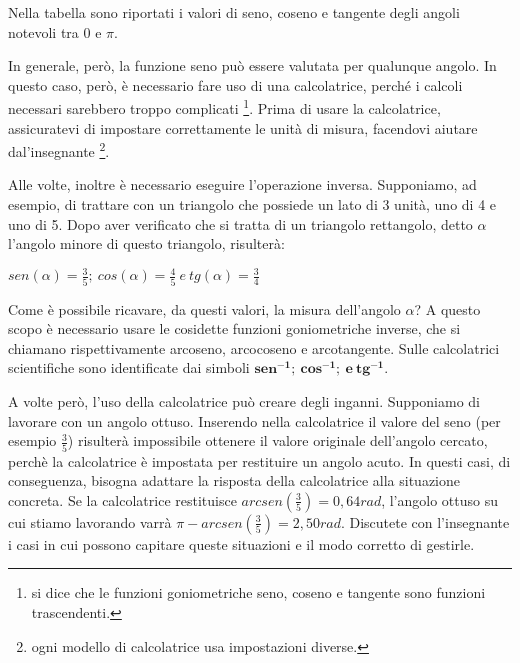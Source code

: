 Nella tabella sono riportati i valori di seno, coseno e tangente degli angoli notevoli tra $0$ e $\pi$.
\newline

In generale, però, la funzione seno può essere valutata per qualunque angolo. In questo caso, però, è necessario fare uso di una calcolatrice, perché i calcoli necessari sarebbero troppo complicati \footnote{si dice che le funzioni goniometriche seno, coseno e tangente sono funzioni trascendenti.}. Prima di usare la calcolatrice, assicuratevi di impostare correttamente le unità di misura, facendovi aiutare dal'insegnante \footnote{ogni modello di calcolatrice usa impostazioni diverse.}.\newline

Alle volte, inoltre è necessario eseguire l'operazione inversa. Supponiamo, ad esempio, di trattare con un triangolo che possiede un lato di 3 unità, uno di 4 e uno di 5.\newline
Dopo aver verificato che si tratta di un triangolo rettangolo, detto $\alpha$ l'angolo minore di questo triangolo, risulterà:\begin{center}
\begin{math}
sen(\alpha)=\frac 3 5 ;\ cos(\alpha)=\frac 4 5\ e\ tg(\alpha)=\frac 3 4
\end{math}
\end{center}
Come è possibile ricavare, da questi valori, la misura dell'angolo $\alpha$?\newline
A questo scopo è necessario usare le cosidette funzioni goniometriche inverse, che si chiamano rispettivamente arcoseno, arcocoseno e arcotangente. Sulle calcolatrici scientifiche sono identificate dai simboli $\mathbf {sen^{-1};\ cos^{-1};\ e\ tg^{-1}}$.
\newline

A volte però, l'uso della calcolatrice può creare degli inganni. Supponiamo di lavorare con un angolo ottuso. Inserendo nella calcolatrice il valore del seno (per esempio $\frac 3 5$) risulterà impossibile ottenere il valore originale dell'angolo cercato, perchè la calcolatrice è impostata per restituire un angolo acuto. In questi casi, di conseguenza, bisogna adattare la risposta della calcolatrice alla situazione concreta.\newline
Se la calcolatrice restituisce $arcsen(\frac 3 5 )=0,64 rad$, l'angolo ottuso su cui stiamo lavorando varrà $\pi - arcsen(\frac 3 5)=2,50 rad$. Discutete con l'insegnante i casi in cui possono capitare queste situazioni e il modo corretto di gestirle.
